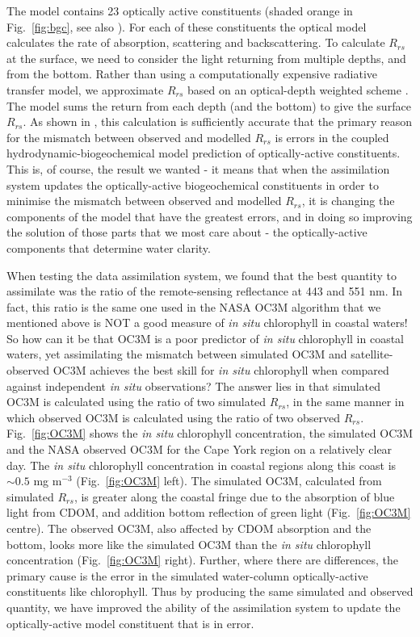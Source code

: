 \documentclass{elsart}
\begin{document}
The model contains 23 optically active constituents (shaded orange in Fig.~\ref{fig:bgc}, see also \citet{Baird16a}). For each of these constituents the optical model calculates the rate of absorption, scattering and backscattering. To calculate $R_{rs}$ at the surface, we need to consider the light returning from multiple depths, and from the bottom. Rather than using a computationally expensive radiative transfer model, we approximate $R_{rs}$ based on an optical-depth weighted scheme \citep{Baird16a}. The model sums the return from each depth (and the bottom) to give the surface $R_{rs}$. As shown in \citet{Baird16a}, this calculation is sufficiently accurate that the primary reason for the mismatch between observed and modelled $R_{rs}$ is errors in the coupled hydrodynamic-biogeochemical model prediction of optically-active constituents. This is, of course, the result we wanted - it means that when the assimilation system updates the optically-active biogeochemical constituents in order to minimise the mismatch between observed and modelled $R_{rs}$, it is changing the components of the model that have the greatest errors, and in doing so improving the solution of those parts that we most care about - the optically-active components that determine water clarity.

When testing the data assimilation system, we found that the best quantity to assimilate was the ratio of the remote-sensing reflectance at 443 and 551 nm. In fact, this ratio is the same one used in the NASA OC3M algorithm that we mentioned above is NOT a good measure of \textit{in situ} chlorophyll in coastal waters! So how can it be that OC3M is a poor predictor of \textit{in situ} chlorophyll in coastal waters, yet assimilating the mismatch between simulated OC3M and satellite-observed OC3M achieves the best skill for \textit{in situ} chlorophyll when compared against independent \textit{in situ} observations? The answer lies in that simulated OC3M is calculated using the ratio of two simulated $R_{rs}$, in the same manner in which observed OC3M is calculated using the ratio of two observed $R_{rs}$. Fig.~\ref{fig:OC3M} shows the \textit{in situ} chlorophyll concentration, the simulated OC3M and the NASA observed OC3M for the Cape York region on a relatively clear day. 
The \textit{in situ} chlorophyll concentration in coastal regions along this coast is $\sim 0.5$ mg m$^{-3}$ (Fig.~\ref{fig:OC3M} left). The simulated OC3M, calculated from simulated $R_{rs}$, is greater along the coastal fringe due to the absorption of blue light from CDOM, and addition bottom reflection of green light (Fig.~\ref{fig:OC3M} centre). The observed OC3M, also affected by CDOM absorption and the bottom, looks more like the simulated OC3M than the \textit{in situ} chlorophyll concentration  (Fig.~\ref{fig:OC3M} right). Further, where there are differences, the primary cause is the error in the simulated water-column optically-active constituents like chlorophyll. Thus by producing the same simulated and observed quantity, we have improved the ability of the assimilation system to update the optically-active model constituent that is in error.
\end{document}
